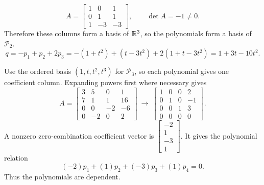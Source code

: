 \[A=\left[\begin{array}{rrr}1&0&1\\0&1&1\\1&-3&-3\end{array}\right],\qquad\det A=-1\ne0.\]
Therefore these columns form a basis of $\mathbb{R}^3$, so the polynomials form a basis of $\mathcal P_2$.
\[q=-p_1+p_2+2p_3=-(1+t^2)+(t-3t^2)+2(1+t-3t^2)=1+3t-10t^2.\]

Use the ordered basis $(1,t,t^2,t^3)$ for $\mathcal P_3$, so each polynomial gives one coefficient column. Expanding powers first where necessary gives
\[A=\left[\begin{array}{rrrr}3&5&0&1\\7&1&1&16\\0&0&-2&-6\\0&-2&0&2\end{array}\right]\ \longrightarrow\ \left[\begin{array}{rrrr}1&0&0&2\\0&1&0&-1\\0&0&1&3\\0&0&0&0\end{array}\right].\]
A nonzero zero-combination coefficient vector is $\left[\begin{array}{r}-2\\1\\-3\\1\end{array}\right]$. It gives the polynomial relation
\[(-2)p_{1}+(1)p_{2}+(-3)p_{3}+(1)p_{4}=0.\]
Thus the polynomials are dependent.

